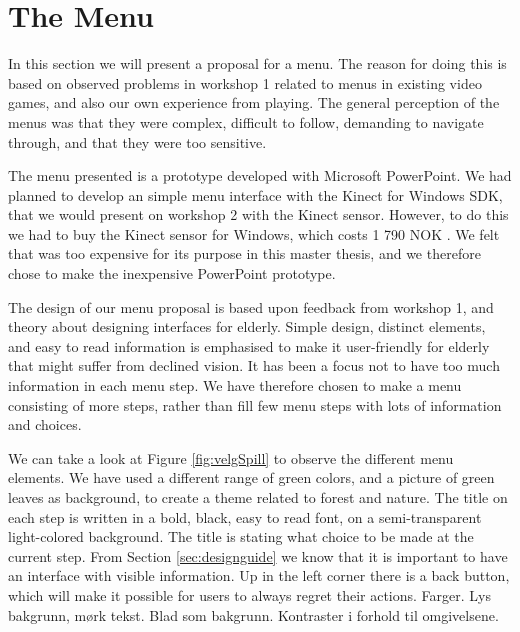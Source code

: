 \section{The Menu}

In this section we will present a proposal for a menu. The reason for doing this is based on observed problems in workshop 1 related to menus in existing video games, and also our own experience from playing. 
The general perception of the menus was that they were complex, difficult to follow, demanding to navigate through, and that they were too sensitive. 

The menu presented is a prototype developed with Microsoft PowerPoint. We had planned to develop an simple menu interface with the Kinect for Windows SDK, that we would present on workshop 2 with the Kinect sensor. However, to do this we had to buy the Kinect sensor for Windows, which costs 1 790 NOK \cite{kinectpc}. We felt that was too expensive for its purpose in this master thesis, and we therefore chose to make the inexpensive PowerPoint prototype.   

The design of our menu proposal is based upon feedback from workshop 1, and theory about designing interfaces for elderly. Simple design, distinct elements, and easy to read information is emphasised to make it user-friendly for elderly that might suffer from declined vision. It has been a focus not to have too much information in each menu step. We have therefore chosen to make a menu consisting of more steps, rather than fill few menu steps with lots of information and choices.   

We can take a look at Figure \ref{fig:velgSpill} to observe the different menu elements. We have used a different range of green colors, and a picture of green leaves as background, to create a theme related to forest and nature. The title on each step is written in a bold, black, easy to read font, on a semi-transparent light-colored background. The title is stating what choice to be made at the current step. From Section \ref{sec:designguide} we know that it is important to have an interface with visible information. Up in the left corner there is a back button, which will make it possible for users to always regret their actions.      
Farger.
Lys bakgrunn, mørk tekst.
Blad som bakgrunn.
Kontraster i forhold til omgivelsene. 

